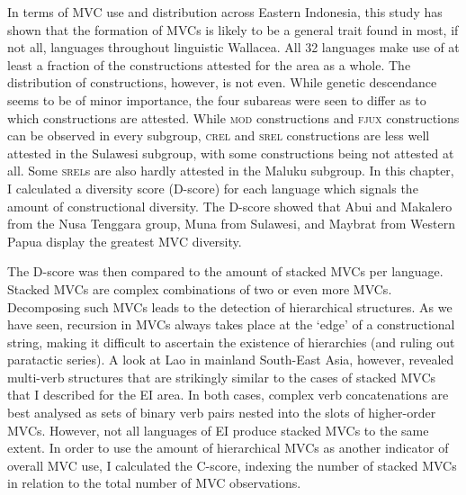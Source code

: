 In terms of MVC use and distribution across Eastern Indonesia, this study has shown that the formation of MVCs is likely to be a general trait found in most, if not all, languages throughout linguistic Wallacea. All 32 languages make use of at least a fraction of the constructions attested for the area as a whole. The distribution of constructions, however, is not even. While genetic descendance seems to be of minor importance, the four subareas were seen to differ as to which constructions are attested. While \textsc{mod} constructions and \textsc{fjux} constructions can be observed in every subgroup, \textsc{crel} and \textsc{srel} constructions are less well attested in the Sulawesi subgroup, with some constructions being not attested at all. Some \textsc{srel}s are also hardly attested in the Maluku subgroup. In this chapter, I calculated a diversity score (D-score) for each language which signals the amount of constructional diversity. The D-score showed that Abui and Makalero from the Nusa Tenggara group, Muna from Sulawesi, and Maybrat from Western Papua display the greatest MVC diversity. 

The D-score was then compared to the amount of stacked MVCs per language. Stacked MVCs are complex combinations of two or even more MVCs. Decomposing such MVCs leads to the detection of hierarchical structures. As we have seen, recursion in MVCs always takes place at the `edge' of a constructional string, making it difficult to ascertain the existence of hierarchies (and ruling out paratactic series). A look at Lao in mainland South-East Asia, however, revealed multi-verb structures that are strikingly similar to the cases of stacked MVCs that I described for the EI area. In both cases, complex verb concatenations are best analysed as sets of binary verb pairs nested into the slots of higher-order MVCs. However, not all languages of EI produce stacked MVCs to the same extent. In order to use the amount of hierarchical MVCs as another indicator of overall MVC use, I calculated the C-score, indexing the number of stacked MVCs in relation to the total number of MVC observations.


